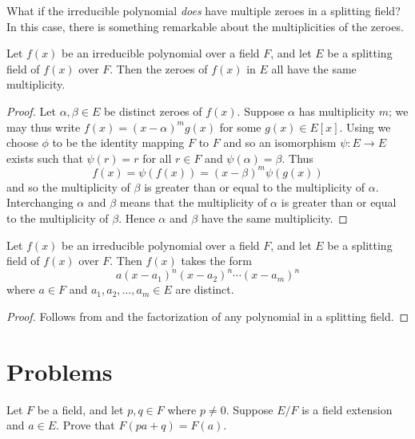 What if the irreducible polynomial \textit{does} have multiple zeroes in a splitting field? In this case, there is something remarkable about the multiplicities of the zeroes.

\begin{theorem}\label{thrm-zeroes-of-irreducible-over-splitting-field-have-same-multiplicity}
    Let $f(x)$ be an irreducible polynomial over a field $F$, and let $E$ be a splitting field of $f(x)$ over $F$. Then the zeroes of $f(x)$ in $E$ all have the same multiplicity.
\end{theorem}
\begin{proof}
    Let $\alpha, \beta \in E$ be distinct zeroes of $f(x)$. Suppose $\alpha$ has multiplicity $m$; we may thus write $f(x) = (x-\alpha)^mg(x)$ for some $g(x) \in E[x]$. Using  we choose $\phi$ to be the identity mapping $F$ to $F$ and so an isomorphism $\psi: E \to E$ exists such that $\psi(r) = r$ for all $r \in F$ and $\psi(\alpha) = \beta$. Thus
    \[
        f(x) = \psi(f(x)) = (x-\beta)^m\psi(g(x))
    \]
    and so the multiplicity of $\beta$ is greater than or equal to the multiplicity of $\alpha$. Interchanging $\alpha$ and $\beta$ means that the multiplicity of $\alpha$ is greater than or equal to the multiplicity of $\beta$. Hence $\alpha$ and $\beta$ have the same multiplicity.
\end{proof}

\begin{corollary}\label{corollary-factorization-of-irreducible-polynomial-over-splitting-field}
    Let $f(x)$ be an irreducible polynomial over a field $F$, and let $E$ be a splitting field of $f(x)$ over $F$. Then $f(x)$ takes the form
    \[
        a(x-a_1)^n(x-a_2)^n\cdots(x-a_m)^n
    \]
    where $a \in F$ and $a_1, a_2, \dots, a_m \in E$ are distinct.
\end{corollary}
\begin{proof}
    Follows from  and the factorization of any polynomial in a splitting field.
\end{proof}

\newpage

\section{Problems}
\begin{problem}\label{problem-simple-extension-absorbs-field-elements}
    Let $F$ be a field, and let $p, q \in F$ where $p \neq 0$. Suppose $E/F$ is a field extension and $a \in E$. Prove that $F(pa + q) = F(a)$.
\end{problem}


